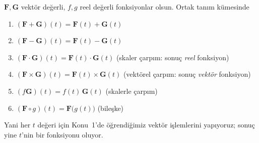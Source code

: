 \begin{tanim}[İşlemler]
$\mathbf F,\mathbf G$ vektör değerli, $f,g$ reel değerli fonksiyonlar olsun. Ortak tanım kümesinde
\begin{enumerate}
\item $(\mathbf F+\mathbf G)(t)=\mathbf F(t)+\mathbf G(t)$
\item $(\mathbf F-\mathbf G)(t)=\mathbf F(t)-\mathbf G(t)$
\item $(\mathbf F\cdot\mathbf G)(t)=\mathbf F(t)\cdot\mathbf G(t)$ \quad (skaler çarpım: sonuç \emph{reel} fonksiyon)
\item $(\mathbf F\times\mathbf G)(t)=\mathbf F(t)\times\mathbf G(t)$ \quad (vektörel çarpım: sonuç \emph{vektör} fonksiyon)
\item $(f\mathbf G)(t)=f(t)\,\mathbf G(t)$ \quad (skalerle çarpım)
\item $(\mathbf F\circ g)(t)=\mathbf F\big(g(t)\big)$ \quad (bileşke)
\end{enumerate}
\end{tanim}

Yani her $t$ değeri için Konu~1'de öğrendiğimiz vektör işlemlerini yapıyoruz; sonuç yine $t$'nin bir fonksiyonu oluyor.

